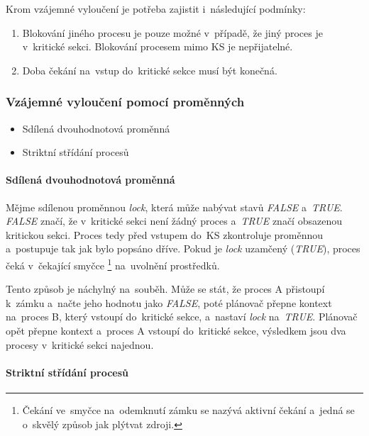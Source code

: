 Krom vzájemné vyloučení je potřeba zajistit i~následující podmínky:

\begin{enumerate}[noitemsep]
	\item Blokování jiného procesu je pouze možné v~případě, že jiný proces je v~kritické sekci. Blokování procesem mimo KS je nepřijatelné.
	\item Doba čekání na~vstup do~kritické sekce musí být konečná.
\end{enumerate}

\subsubsection{Vzájemné vyloučení pomocí proměnných}

\begin{itemize}[noitemsep]
	\item Sdílená dvouhodnotová proměnná
	\item Striktní střídání procesů
\end{itemize}

\paragraph{Sdílená dvouhodnotová proměnná}

Mějme sdílenou proměnnou \emph{lock}, která může nabývat stavů \emph{FALSE} a~\emph{TRUE}. \emph{FALSE} značí, že v~kritické sekci není žádný proces a~\emph{TRUE} značí obsazenou kritickou sekci. Proces tedy před vstupem do~KS zkontroluje proměnnou a~postupuje tak jak bylo popsáno dříve. Pokud je \emph{lock} uzamčený (\emph{TRUE}), proces čeká v~čekající smyčce%
\footnote{Čekání ve~smyčce na~odemknutí zámku se nazývá aktivní čekání a~jedná se o~skvělý způsob jak plýtvat zdroji.}
na~uvolnění prostředků.

Tento způsob je náchylný na~souběh. Může se stát, že proces A přistoupí k~zámku a~načte jeho hodnotu jako \emph{FALSE}, poté plánovač přepne kontext na~proces B, který vstoupí do~kritické sekce, a~nastaví \emph{lock} na~\emph{TRUE}. Plánovač opět přepne kontext a~proces A vstoupí do~kritické sekce, výsledkem jsou dva procesy v~kritické sekci najednou.

\paragraph{Striktní střídání procesů}

